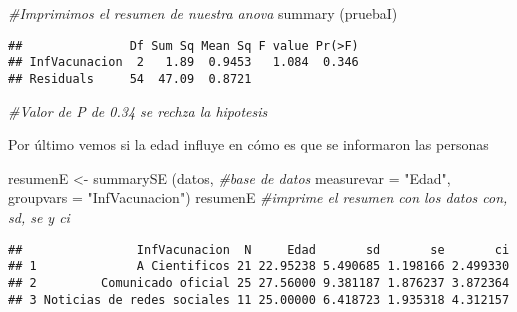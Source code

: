 \documentclass[
]{article}
\newenvironment{Shaded}{\begin{snugshade}}{\end{snugshade}}
\newcommand{\AttributeTok}[1]{\textcolor[rgb]{0.77,0.63,0.00}{#1}}
\newcommand{\CommentTok}[1]{\textcolor[rgb]{0.56,0.35,0.01}{\textit{#1}}}
\newcommand{\FunctionTok}[1]{\textcolor[rgb]{0.00,0.00,0.00}{#1}}
\newcommand{\NormalTok}[1]{#1}
\newcommand{\OtherTok}[1]{\textcolor[rgb]{0.56,0.35,0.01}{#1}}
\newcommand{\StringTok}[1]{\textcolor[rgb]{0.31,0.60,0.02}{#1}}
\begin{document}
\begin{Shaded}
\begin{Highlighting}[]
\CommentTok{\#Imprimimos el resumen de nuestra anova}
\FunctionTok{summary}\NormalTok{ (pruebaI)}
\end{Highlighting}
\end{Shaded}

\begin{verbatim}
##               Df Sum Sq Mean Sq F value Pr(>F)
## InfVacunacion  2   1.89  0.9453   1.084  0.346
## Residuals     54  47.09  0.8721
\end{verbatim}

\begin{Shaded}
\begin{Highlighting}[]
\CommentTok{\#Valor de P de 0.34 se rechza la hipotesis}
\end{Highlighting}
\end{Shaded}

Por último vemos si la edad influye en cómo es que se informaron las
personas

\begin{Shaded}
\begin{Highlighting}[]
\NormalTok{resumenE }\OtherTok{\textless{}{-}} \FunctionTok{summarySE}\NormalTok{ (datos, }\CommentTok{\#base de datos}
                      \AttributeTok{measurevar =} \StringTok{"Edad"}\NormalTok{, }
                      \AttributeTok{groupvars =} \StringTok{"InfVacunacion"}\NormalTok{) }
\NormalTok{resumenE }\CommentTok{\#imprime el resumen con los datos con, sd, se y ci}
\end{Highlighting}
\end{Shaded}

\begin{verbatim}
##                InfVacunacion  N     Edad       sd       se       ci
## 1              A Cientificos 21 22.95238 5.490685 1.198166 2.499330
## 2         Comunicado oficial 25 27.56000 9.381187 1.876237 3.872364
## 3 Noticias de redes sociales 11 25.00000 6.418723 1.935318 4.312157
\end{verbatim}
\end{document}
